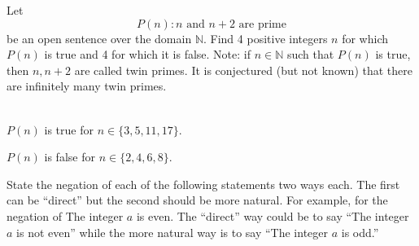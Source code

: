 \documentclass[12 pt]{exam}
\begin{document}
\begin{questions}
\begin{parts}
\end{parts}


\question Let $$P(n): n \textrm{ and } n+2 \textrm{ are prime}$$ be an open sentence over the domain $\mathbb{N}$. Find 4 positive integers $n$ for which $P(n)$ is true and 4 for which it is false. Note: if $n \in \mathbb{N}$ such that $P(n)$ is true, then $n, n+2$ are called twin primes. It is conjectured (but not known) that there are infinitely many twin primes. 
\begin{solution}\\
$P(n)$ is true for $n \in \{3, 5, 11, 17\}$.

$P(n)$ is false for $n \in \{2, 4, 6, 8\}$.
\end{solution}


\question State the negation of each of the following statements two ways each. The first can be ``direct'' but the second should be more natural. For example, for the negation of The integer $a$ is even. The ``direct'' way could be to say ``The integer $a$ is not even'' while the more natural way is to say ``The integer $a$ is odd.'' 
\end{questions}
\end{document}
